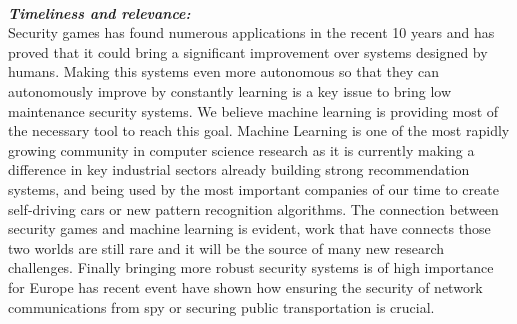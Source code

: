 \noindent \textbf{\textit{\\Timeliness and relevance:}}\\
Security games has found numerous applications in the recent 10 years and has proved that it could bring a significant improvement over  systems designed by humans. Making this systems even more autonomous so that they can autonomously improve by constantly learning is a key issue to bring low maintenance security systems. We believe machine learning is providing most of the necessary tool to reach this goal. Machine Learning is one of the most rapidly growing community in computer science research as it is currently making a difference in key industrial sectors already  building strong recommendation systems, and being used by the most important companies of our time to create self-driving cars or new pattern recognition algorithms.   The connection between security games and machine learning is evident, work that have connects those two worlds are still rare and it will be the source of many new research challenges. 
Finally bringing more robust security systems is of high importance for Europe has recent event have shown how ensuring the security of network communications from spy or securing public transportation is crucial.
 